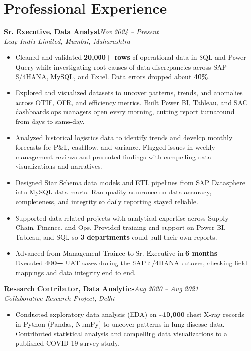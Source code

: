 \documentclass[10pt, letterpaper]{article}
\newcommand{\role}[3]{%
  \vspace{2pt}%
  {\bfseries #1}\hfill{\small\color{muted}\textit{#3}}\\[-2pt]%
  {\small\color{muted}\textit{#2}}%
}
\begin{document}
\section{Professional Experience}

\role{Sr. Executive, Data Analyst}{Leap India Limited, Mumbai, Maharashtra}{Nov 2024 -- Present}

\begin{itemize}
  \item Cleaned and validated \textbf{20,000+ rows} of operational data in SQL and Power Query while investigating root causes of data discrepancies across SAP S/4HANA, MySQL, and Excel. Data errors dropped about \textbf{40\%}.
  \item Explored and visualized datasets to uncover patterns, trends, and anomalies across OTIF, OFR, and efficiency metrics. Built Power BI, Tableau, and SAC dashboards ops managers open every morning, cutting report turnaround from days to same-day.
  \item Analyzed historical logistics data to identify trends and develop monthly forecasts for P\&L, cashflow, and variance. Flagged issues in weekly management reviews and presented findings with compelling data visualizations and narratives.
  \item Designed Star Schema data models and ETL pipelines from SAP Datasphere into MySQL data marts. Ran quality assurance on data accuracy, completeness, and integrity so daily reporting stayed reliable.
  \item Supported data-related projects with analytical expertise across Supply Chain, Finance, and Ops. Provided training and support on Power BI, Tableau, and SQL so \textbf{3 departments} could pull their own reports.
  \item Advanced from Management Trainee to Sr. Executive in \textbf{6 months}. Executed \textbf{400+} UAT cases during the SAP S/4HANA cutover, checking field mappings and data integrity end to end.
\end{itemize}

\vspace{1pt}

\role{Research Contributor, Data Analytics}{Collaborative Research Project, Delhi}{Aug 2020 -- Aug 2021}

\begin{itemize}
  \item Conducted exploratory data analysis (EDA) on \textbf{\textasciitilde10,000} chest X-ray records in Python (Pandas, NumPy) to uncover patterns in lung disease data. Contributed statistical analysis and compelling data visualizations to a published COVID-19 survey study.
\end{itemize}
\end{document}
